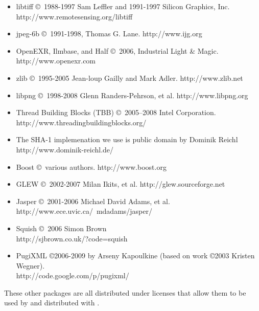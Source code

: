 \begin{itemize}
\item {\cf libtiff} \copyright\ 1988-1997 Sam Leffler and 1991-1997 Silicon
Graphics, Inc. \\ {\cf http://www.remotesensing.org/libtiff}
\item {\cf jpeg-6b} \copyright\ 1991-1998, Thomas G. Lane.  {\cf http://www.ijg.org}
\item OpenEXR, Ilmbase, and Half \copyright\ 2006, Industrial Light \& Magic.\\
{\cf http://www.openexr.com}
\item {\cf zlib} \copyright\ 1995-2005 Jean-loup Gailly and Mark Adler. 
{\cf http://www.zlib.net}
\item {\cf libpng} \copyright\ 1998-2008 Glenn Randers-Pehrson, et al.  
{\cf http://www.libpng.org}
\item Thread Building Blocks (TBB) \copyright\ 2005--2008 Intel Corporation.
{\cf http://www.threadingbuildingblocks.org/}
\item The SHA-1 implemenation we use is public domain by
Dominik Reichl \\ {\cf http://www.dominik-reichl.de/}
\item Boost \copyright\ various authors. {\cf http://www.boost.org}
\item GLEW \copyright\ 2002-2007 Milan Ikits, et al. 
{\cf http://glew.sourceforge.net}
\item Jasper \copyright\ 2001-2006 Michael David Adams, et al. \\
{\cf http://www.ece.uvic.ca/~mdadams/jasper/}
\item Squish \copyright\ 2006 Simon Brown \\ 
{\cf http://sjbrown.co.uk/?code=squish}
\item PugiXML \copyright 2006-2009 by Arseny Kapoulkine (based on work
\copyright 2003 Kristen Wegner). \\
{\cf http://code.google.com/p/pugixml/}
\end{itemize}

These other packages are all distributed under licenses that allow them
to be used by and distributed with \product.

\chapwidthend
